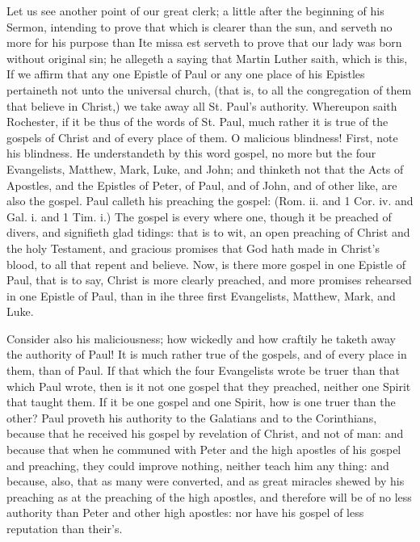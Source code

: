 Let us see another point of our great clerk; a little after
the beginning of his Sermon, intending to prove that which
is clearer than the sun, and serveth no more for his purpose
than Ite missa est serveth to prove that our lady was 
born without original sin; he allegeth a saying that Martin 
Luther saith, which is this, If we affirm that any one 
Epistle of Paul or any one place of his Epistles pertaineth 
not unto the universal church, (that is, to all the congregation
of them that believe in Christ,) we take away all St. 
Paul's authority. Whereupon saith Rochester, if it be thus 
of the words of St. Paul, much rather it is true of the gospels
of Christ and of every place of them. O malicious 
blindness! First, note his blindness. He understandeth 
by this word gospel, no more but the four Evangelists, 
Matthew, Mark, Luke, and John; and thinketh not that 
the Acts of Apostles, and the Epistles of Peter, of Paul,
and of John, and of other like, are also the gospel. Paul
calleth his preaching the gospel: (Rom. ii. and 1 Cor. iv.
and Gal. i. and 1 Tim. i.) The gospel is every where 
one, though it be preached of divers, and signifieth glad
tidings: that is to wit, an open preaching of Christ and
the holy Testament, and gracious promises that God hath 
made in Christ's blood, to all that repent and believe. 
Now, is there more gospel in one Epistle of Paul, that is to 
say, Christ is more clearly preached, and more promises 
rehearsed in one Epistle of Paul, than in ihe three first 
Evangelists, Matthew, Mark, and Luke. 

Consider also his maliciousness; how wickedly and how 
craftily he taketh away the authority of Paul! It is much 
rather true of the gospels, and of every place in them, than 
of Paul. If that which the four Evangelists wrote be 
truer than that which Paul wrote, then is it not one gospel 
that they preached, neither one Spirit that taught them.
If it be one gospel and one Spirit, how is one truer than 
the other? Paul proveth his authority to the Galatians 
and to the Corinthians, because that he received his gospel 
by revelation of Christ, and not of man: and because that 
when he communed with Peter and the high apostles of 
his gospel and preaching, they could improve nothing, 
neither teach him any thing: and because, also, that as 
many were converted, and as great miracles shewed by his 
preaching as at the preaching of the high apostles, and 
therefore will be of no less authority than Peter and other 
high apostles: nor have his gospel of less reputation 
than their's. 

